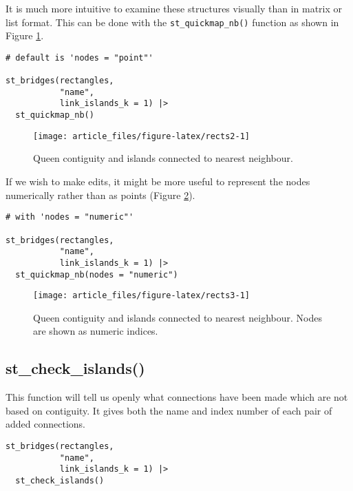 It is much more intuitive to examine these structures visually than in
matrix or list format. This can be done with the \texttt{st\_quickmap\_nb()}
function as shown in Figure \ref{fig:rects2}.

\begin{verbatim}
# default is 'nodes = "point"'

st_bridges(rectangles, 
           "name", 
           link_islands_k = 1) |> 
  st_quickmap_nb()
\end{verbatim}

\begin{figure}

{\centering \texttt{[image: article\_files/figure-latex/rects2-1]} 

}

\caption{Queen contiguity and islands connected to nearest neighbour. }\label{fig:rects2}
\end{figure}

If we wish to make edits, it might be more useful to represent the nodes
numerically rather than as points (Figure \ref{fig:rects3}).

\begin{verbatim}
# with 'nodes = "numeric"'

st_bridges(rectangles, 
           "name", 
           link_islands_k = 1) |> 
  st_quickmap_nb(nodes = "numeric")
\end{verbatim}

\begin{figure}

{\centering \texttt{[image: article\_files/figure-latex/rects3-1]} 

}

\caption{Queen contiguity and islands connected to nearest neighbour. Nodes are shown as numeric indices. }\label{fig:rects3}
\end{figure}

\hypertarget{st_check_islands}{%
\subsection{st\_check\_islands()}\label{st_check_islands}}

This function will tell us openly what connections have been made which
are not based on contiguity. It gives both the name and index number of each pair of added connections.

\begin{verbatim}
st_bridges(rectangles, 
           "name", 
           link_islands_k = 1) |> 
  st_check_islands()
\end{verbatim}


